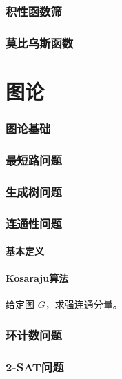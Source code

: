 \documentclass[12pt,a4paper]{article}
\begin{document}
\section{积性函数筛}

\newpage
\section{莫比乌斯函数}

\newpage
\part{图论} %
\section{图论基础}

\newpage
\section{最短路问题} %

\newpage
\section{生成树问题} %

\newpage
\section{连通性问题}
\subsection{基本定义}
\subsection{Kosaraju算法}
\begin{mdframed}[leftline=true, linewidth=2pt, linecolor=gray]
	给定图 $G$，求强连通分量。
\end{mdframed}

\newpage
\section{环计数问题}

\newpage
\section{2-SAT问题}
\end{document}
